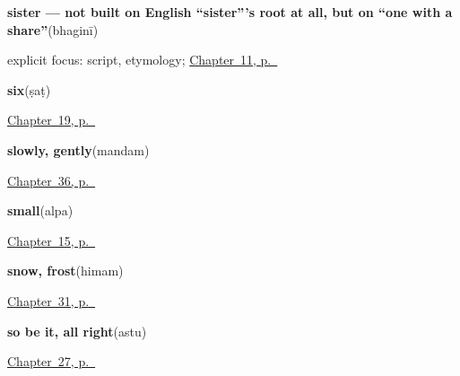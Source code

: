 \noindent\begin{minipage}[t]{\linewidth}
\raggedright
\textbf{sister — not built on English \textquotedblleft{}sister\textquotedblright{}'s root at all, but on \textquotedblleft{}one with a share\textquotedblright{}}\enspace\emph{}\enspace(bhaginī)\par
\footnotesize explicit focus: script, etymology; \hyperref[ch:sa-people-nouns]{Chapter~11, p.~\pageref*{ch:sa-people-nouns}}
\end{minipage}\par\smallskip

\noindent\begin{minipage}[t]{\linewidth}
\raggedright
\textbf{six}\enspace\emph{}\enspace(ṣaṭ)\par
\footnotesize \hyperref[ch:sa-numbers-6-10]{Chapter~19, p.~\pageref*{ch:sa-numbers-6-10}}
\end{minipage}\par\smallskip

\noindent\begin{minipage}[t]{\linewidth}
\raggedright
\textbf{slowly, gently}\enspace\emph{}\enspace(mandam)\par
\footnotesize \hyperref[ch:sa-replies-more]{Chapter~36, p.~\pageref*{ch:sa-replies-more}}
\end{minipage}\par\smallskip

\noindent\begin{minipage}[t]{\linewidth}
\raggedright
\textbf{small}\enspace\emph{}\enspace(alpa)\par
\footnotesize \hyperref[ch:sa-describing-things]{Chapter~15, p.~\pageref*{ch:sa-describing-things}}
\end{minipage}\par\smallskip

\noindent\begin{minipage}[t]{\linewidth}
\raggedright
\textbf{snow, frost}\enspace\emph{}\enspace(himam)\par
\footnotesize \hyperref[ch:sa-sky]{Chapter~31, p.~\pageref*{ch:sa-sky}}
\end{minipage}\par\smallskip

\noindent\begin{minipage}[t]{\linewidth}
\raggedright
\textbf{so be it, all right}\enspace\emph{}\enspace(astu)\par
\footnotesize \hyperref[ch:sa-replies]{Chapter~27, p.~\pageref*{ch:sa-replies}}
\end{minipage}\par\smallskip

